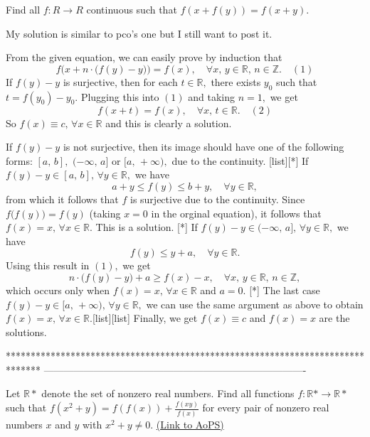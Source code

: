 \begin{solution}
	\begin{tcolorbox}Find all $f:R \rightarrow R$  continuous such that
$f(x+f(y))=f(x+y).$\end{tcolorbox}
My solution is similar to pco's one but I still want to post it.

From the given equation, we can easily prove by induction that \[f\Big(x+n\cdot \big(f(y)-y\big)\Big)=f(x),\quad \forall x,\, y \in \mathbb R,\, n \in \mathbb Z.\quad (1)\] If $f(y) -y$ is surjective, then for each $t \in \mathbb R,$ there exists $y_0$ such that $t=f(y_0)-y_0.$ Plugging this into $(1)$ and taking $n=1,$ we get \[f(x+t)=f(x),\quad \forall x,\,t \in \mathbb R.\quad (2)\] So $f(x)\equiv c,\, \forall x \in \mathbb R$ and this is clearly a solution.

If $f(y)-y$ is not surjective, then its image should have one of the following forms: $[a,\,b],$ $(-\infty, \, a]$ or $[a,\, +\infty),$ due to the continuity.
[list][*] If $f(y)-y\in [a,\,b],\, \forall y \in \mathbb R,$ we have \[a+y \le f(y)\le b+y,\quad \forall y \in \mathbb R,\] from which it follows that $f$ is surjective due to the continuity. Since $f\big(f(y)\big)=f(y)$ (taking $x=0$ in the orginal equation), it follows that $f(x)=x,\, \forall x \in \mathbb R.$ This is a solution.
[*] If $f(y)-y \in (-\infty,\, a],\, \forall y \in \mathbb R,$ we have \[f(y)\le y+a,\quad \forall y \in \mathbb R.\] Using this result in $(1),$ we get \[n \cdot \big( f(y)-y\big)+a \ge f(x)-x,\quad \forall x,\, y \in \mathbb R,\, n \in \mathbb Z,\] which occurs only when $f(x)=x,\,\forall x \in \mathbb R$ and $a=0.$
[*] The last case $f(y)-y \in [a,\, +\infty),\, \forall y \in \mathbb R,$ we can use the same argument as above to obtain $f(x)=x,\, \forall x \in \mathbb R.$[\/list][\/list] Finally, we get $f(x)\equiv c$ and $f(x)=x$ are the solutions.
\end{solution}
*******************************************************************************
-------------------------------------------------------------------------------

\begin{problem}
	Let $\mathbb{R}*$ denote the set of nonzero real numbers. Find all functions $f:\mathbb{R}* \rightarrow \mathbb{R}*$ such that $f(x^2+y)=f(f(x))+\frac{f(xy)}{f(x)}$ for every pair of nonzero real numbers $x$ and $y$ with $x^2+y \neq 0$.
	\flushright \href{https://artofproblemsolving.com/community/c6h587225}{(Link to AoPS)}
\end{problem}



